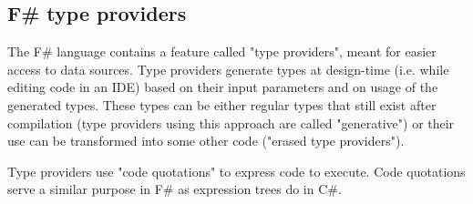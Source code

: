 \subsection{F\# type providers}

The F\# language contains a feature called "type providers", \cite{type-providers} meant for easier access to data sources. Type providers generate types at design-time (i.e. while editing code in an \ac{IDE}) based on their input parameters and on usage of the generated types. These types can be either regular types that still exist after compilation (type providers using this approach are called "generative") or their use can be transformed into some other code ("erased type providers").

Type providers use "code quotations" to express code to execute. Code quotations serve a similar purpose in F\# as expression trees do in C\#.

